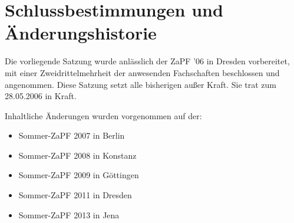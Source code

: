 \documentclass[draft,12pt,oneside]{scrreprt}
\begin{document}
\section*{Schlussbestimmungen und Änderungshistorie}
Die vorliegende Satzung wurde anlässlich der ZaPF '06 in Dresden vorbereitet,
mit einer Zweidrittelmehrheit der anwesenden Fachschaften beschlossen und
angenommen. Diese Satzung setzt alle bisherigen außer Kraft. Sie trat zum
28.05.2006 in Kraft.

Inhaltliche Änderungen wurden vorgenommen auf der:

\begin{itemize}

  \item Sommer-ZaPF 2007 in Berlin

  \item Sommer-ZaPF 2008 in Konstanz

  \item Sommer-ZaPF 2009 in Göttingen

  \item Sommer-ZaPF 2011 in Dresden

  \item Sommer-ZaPF 2013 in Jena

\end{itemize}
\end{document}
